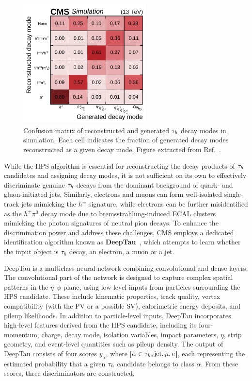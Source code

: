 \begin{figure}[h]
\centering
\includegraphics[width=0.6\textwidth]{Figures/Chapter4/HPS_DecayMode_Performance.pdf}
\caption[Hadronic tau decay mode confusion matrix]{Confusion matrix of reconstructed and generated $\tau_h$ decay modes in simulation. Each cell indicates the fraction of generated decay modes reconstructed as a given decay mode. Figure extracted from Ref.~\cite{DeepTau_20-001}.}
\label{Figure:Chapter4_HPS_ConfusionMatrix}
\end{figure}

While the HPS algorithm is essential for reconstructing the decay products of $\tau_h$ candidates and assigning decay modes, it is not sufficient on its own to effectively discriminate genuine $\tau_h$ decays from the dominant background of quark- and gluon-initiated jets. Similarly, electrons and muons can form well-isolated single-track jets mimicking the $h^\pm$ signature, while electrons can be further misidentified as the $h^\pm \pi^0$ decay mode due to bremsstrahlung-induced ECAL clusters mimicking the photon signatures of neutral pion decays. To enhance the discrimination power and address these challenges, CMS employs a dedicated identification algorithm known as \textbf{DeepTau}~\cite{DeepTau_20-001,DeepTau_24-001}, which attempts to learn whether the input object is $\tau_h$ decay, an electron, a muon or a jet. 

DeepTau is a multiclass neural network combining convolutional and dense layers. The convolutional part of the network is designed to capture complex spatial patterns in the $\eta$–$\phi$ plane, using low-level inputs from particles surrounding the HPS candidate. These include kinematic properties, track quality, vertex compatibility (with the PV or a possible SV), calorimetric energy deposits, and pileup likelihoods. In addition to particle-level inputs, DeepTau incorporates high-level features derived from the HPS candidate, including its four-momentum, charge, decay mode, isolation variables, impact parameters, $\eta$, strip geometry, and event-level quantities such as pileup density. The output of DeepTau consists of four scores $y_\alpha$, where \textbf{[$\alpha \in {\PGt_h,\text{jet},\mu,\text{e}}$]}, each representing the estimated probability that a given $\tau_h$ candidate belongs to class $\alpha$. From these scores, three discriminators are constructed,

